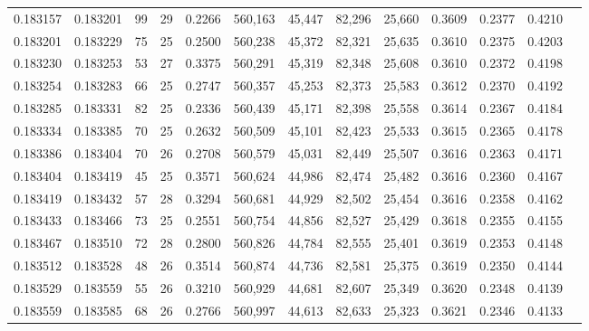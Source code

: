 \begin{tabular}{rrrrrrrrrrrrr}
0.183157 & 0.183201 &  99 &  29 &                                     0.2266 & 560,163 &  45,447 &  82,296 &  25,660 & 0.3609 & 0.2377 & 0.4210 \\
0.183201 & 0.183229 &  75 &  25 &                                     0.2500 & 560,238 &  45,372 &  82,321 &  25,635 & 0.3610 & 0.2375 & 0.4203 \\
0.183230 & 0.183253 &  53 &  27 &                                     0.3375 & 560,291 &  45,319 &  82,348 &  25,608 & 0.3610 & 0.2372 & 0.4198 \\
0.183254 & 0.183283 &  66 &  25 &                                     0.2747 & 560,357 &  45,253 &  82,373 &  25,583 & 0.3612 & 0.2370 & 0.4192 \\
0.183285 & 0.183331 &  82 &  25 &                                     0.2336 & 560,439 &  45,171 &  82,398 &  25,558 & 0.3614 & 0.2367 & 0.4184 \\
0.183334 & 0.183385 &  70 &  25 &                                     0.2632 & 560,509 &  45,101 &  82,423 &  25,533 & 0.3615 & 0.2365 & 0.4178 \\
0.183386 & 0.183404 &  70 &  26 &                                     0.2708 & 560,579 &  45,031 &  82,449 &  25,507 & 0.3616 & 0.2363 & 0.4171 \\
0.183404 & 0.183419 &  45 &  25 &                                     0.3571 & 560,624 &  44,986 &  82,474 &  25,482 & 0.3616 & 0.2360 & 0.4167 \\
0.183419 & 0.183432 &  57 &  28 &                                     0.3294 & 560,681 &  44,929 &  82,502 &  25,454 & 0.3616 & 0.2358 & 0.4162 \\
0.183433 & 0.183466 &  73 &  25 &                                     0.2551 & 560,754 &  44,856 &  82,527 &  25,429 & 0.3618 & 0.2355 & 0.4155 \\
0.183467 & 0.183510 &  72 &  28 &                                     0.2800 & 560,826 &  44,784 &  82,555 &  25,401 & 0.3619 & 0.2353 & 0.4148 \\
0.183512 & 0.183528 &  48 &  26 &                                     0.3514 & 560,874 &  44,736 &  82,581 &  25,375 & 0.3619 & 0.2350 & 0.4144 \\
0.183529 & 0.183559 &  55 &  26 &                                     0.3210 & 560,929 &  44,681 &  82,607 &  25,349 & 0.3620 & 0.2348 & 0.4139 \\
0.183559 & 0.183585 &  68 &  26 &                                     0.2766 & 560,997 &  44,613 &  82,633 &  25,323 & 0.3621 & 0.2346 & 0.4133 \\

\end{tabular}
